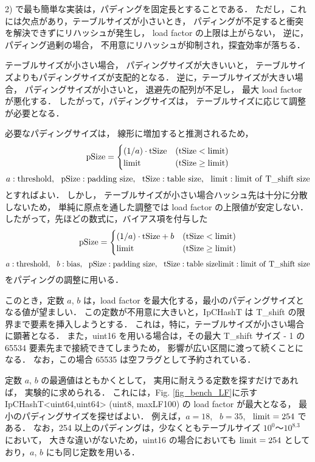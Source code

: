 2) で最も簡単な実装は，パディングを固定長とすることである．
ただし，これには欠点があり，テーブルサイズが小さいとき，
パディングが不足すると衝突を解決できずにリハッシュが発生し，
load factor の上限は上がらない，
逆に，パディング過剰の場合，
不用意にリハッシュが抑制され，探査効率が落ちる．

テーブルサイズが小さい場合，
パディングサイズが大きいいと，
テーブルサイズよりもパディングサイズが支配的となる．
逆に，テーブルサイズが大きい場合，
パディングサイズが小さいと，
退避先の配列が不足し，
最大 load factor が悪化する．
したがって，パディングサイズは，
テーブルサイズに応じて調整が必要となる．

必要なパディングサイズは，
線形に増加すると推測されるため，
\[
  {\rm pSize} = \begin{cases}
    (1/a) \cdot {\rm tSize} & ({\rm tSize}<{\rm limit}) \\
    {\rm limit}    & ({\rm tSize}\geq{\rm limit})
  \end{cases}
\]
\[
  a: {\rm threshold}, \ \ 
  {\rm pSize}: {\rm padding \ size}, \ \ 
  {\rm tSize}: {\rm table \ size}, \ \ 
  {\rm limit}: {\rm limit \ of \ T\_shift \ size}
\]
とすればよい．
しかし，
テーブルサイズが小さい場合ハッシュ先は十分に分散しないため，
単純に原点を通した調整では load factor の上限値が安定しない．
したがって，先ほどの数式に，バイアス項を付与した
\[
  {\rm pSize} = \begin{cases}
    (1/a) \cdot {\rm tSize} + b & ({\rm tSize}<{\rm limit}) \\
    {\rm limit}    & ({\rm tSize}\geq{\rm limit})
  \end{cases}
\]
\[
  a: {\rm threshold}, \ \ 
  b: {\rm bias}, \ \ 
  {\rm pSize}: {\rm padding \ size}, \ \ 
  {\rm tSize}: {\rm table \ size}
  {\rm limit}: {\rm limit \ of \ T\_shift \ size}
\]
をパディングの調整に用いる．

このとき，定数 $a$, $b$ は，load factor を最大化する，最小のパディングサイズとなる値が望ましい．
この定数が不用意に大きいと，IpCHashT は T\_shift の限界まで要素を挿入しようとする．
これは，特に，テーブルサイズが小さい場合に顕著となる．
また，uint16 を用いる場合は，その最大 T\_shift サイズ - 1 の 65534 要素先まで接続できてしまうため，
影響が広い区間に渡って続くことになる．
なお，この場合 65535 は空フラグとして予約されている．

定数 $a$, $b$ の最適値はともかくとして，
実用に耐えうる定数を探すだけであれば，
実験的に求められる．
これには，Fig. \ref{fig_bench_LF}に示す IpCHashT<uint64,uint64> (uint8, maxLF100) の load factor が最大となる，
最小のパディングサイズを探せばよい．
例えば，$a=18$, \ $b=35$, \ ${\rm limit}=254$ である．
なお，254 以上のパディングは，少なくともテーブルサイズ $10^0〜10^{8.3}$ において，
大きな違いがないため，uint16 の場合においても ${\rm limit}=254$ としており，$a$, $b$ にも同じ定数を用いる．


